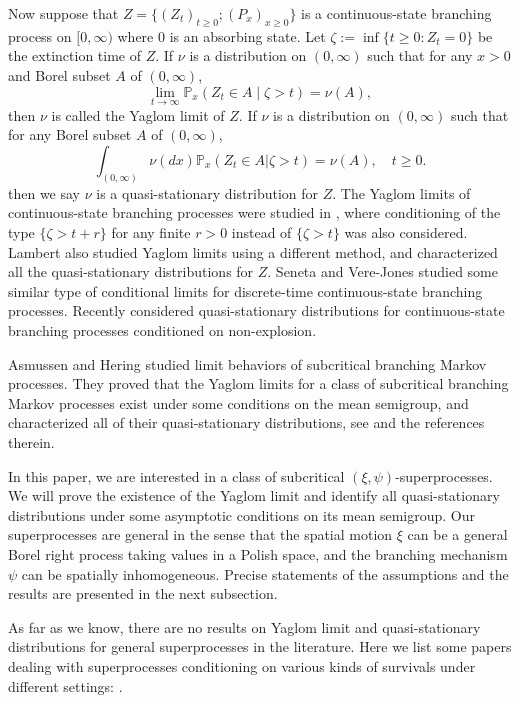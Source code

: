 \documentclass[12pt,a4paper]{amsart}
\numberwithin{equation}{section}
\theoremstyle{plain}
\theoremstyle{definition}
\theoremstyle{remark}
\begin{document}
	Now suppose that $Z =\{(Z_t)_{t \geq 0}; (P_x)_{x\geq 0}\}$  is a  continuous-state branching process on $[0,\infty)$ where $0$ is an absorbing state.  Let $\zeta:=\inf\{t\geq 0: Z_t=0\}$ be the extinction time of $Z$.
	If $\nu$ is a distribution on $(0,\infty)$ such that for any $x>0$ and Borel subset $A$ of $(0,\infty)$,
\[
	\lim_{t\rightarrow\infty}\mathbb P_x\left(Z_t\in A\middle|\zeta>t\right)=\nu(A),
\]
	then $\nu$ is called the Yaglom limit of $Z$.
	If $\nu$ is a distribution on $(0,\infty)$ such that for any Borel subset $A$ of $(0,\infty)$,
\[
	\int_{(0,\infty)} \nu(dx)\mathbb P_x (Z_t \in A | \zeta > t) = \nu (A), \quad t\geq 0.
\]
	then we say $\nu$ is a quasi-stationary distribution for $Z$.
	The Yaglom limits of continuous-state branching processes were studied in \cite{Li00}, where conditioning of the type $\{\zeta>t+r\}$ for any finite $r>0$ instead of $\{\zeta>t\}$ was also considered.
	Lambert \cite{Lambert2007Quasi-stationary} also studied Yaglom limits using a different method, and characterized all the quasi-stationary distributions  for $Z$.
	Seneta and Vere-Jones \cite{SenetaVere-Jones1968On} studied some similar type of conditional limits for discrete-time continuous-state branching processes.
	Recently \cite{Labbe2013Quasi-stationary} considered quasi-stationary distributions for continuous-state branching processes conditioned on non-explosion.

	Asmussen and Hering \cite{AH} studied limit behaviors of subcritical branching Markov processes.
	They proved that the Yaglom limits for a class of subcritical  branching Markov processes exist under some conditions on the mean semigroup, and characterized all of their quasi-stationary distributions, see \cite[Chapter 5]{AH} and the references therein.

	In this paper, we are interested in a class of subcritical $(\xi, \psi)$-superprocesses.
	We will prove the existence of the Yaglom limit and identify all  quasi-stationary distributions under some asymptotic conditions on its mean semigroup.
	Our superprocesses are general in the sense that the spatial motion $\xi$ can be a general Borel right process taking values in a Polish space,
	and the branching mechanism $\psi$ can be spatially inhomogeneous.
	Precise statements of the assumptions and the results are presented in the next subsection.
	
	As far as we know, there are no results on
	Yaglom limit and quasi-stationary distributions for general superprocesses in the  literature.
	Here we list some papers dealing with superprocesses conditioning on various kinds of survivals under different settings:
	\cite{ChampagnatRaelly2008Limit, Etheridge2003A-decomposition, Evans1992The-entrance, EvansPerkins1990Measure-valued, LiuRen2009Some, RenSongSun2019Spine, RenSongSun2018Limit, RenSongZhang2015Limit, Serlet1996Occupation}.
\end{document}
